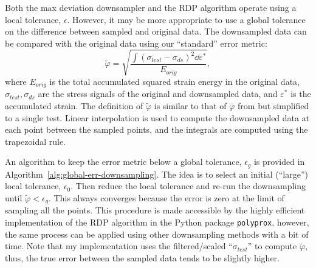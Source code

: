 \documentclass[a4paper,11pt]{article}
\begin{document}
Both the max deviation downsampler and the RDP algorithm operate using a local tolerance, $\epsilon$.
However, it may be more appropriate to use a global tolerance on the difference between sampled and original data.
The downsampled data can be compared with the original data using our ``standard'' error metric:
\begin{equation}
    \tilde{\varphi} = \sqrt{\frac{\int (\sigma_{test} - \sigma_{ds})^2 \dd \varepsilon^*}{E_{orig}}},
\end{equation}
where $E_{orig}$ is the total accumulated squared strain energy in the original data, $\sigma_{test}, \sigma_{ds}$ are the stress signals of the original and downsampled data, and $\varepsilon^*$ is the accumulated strain.
The definition of $\tilde{\varphi}$ is similar to that of $\bar{\varphi}$ from \citet{deCastroeSousaConsistencySolvingInverse2020} but simplified to a single test.
Linear interpolation is used to compute the downsampled data at each point between the sampled points, and the integrals are computed using the trapezoidal rule.

An algorithm to keep the error metric below a global tolerance, $\epsilon_g$ is provided in Algorithm~\ref{alg:global-err-downsampling}.
The idea is to select an initial (``large'') local tolerance, $\epsilon_0$.
Then reduce the local tolerance and re-run the downsampling until $\tilde{\varphi} < \epsilon_{g}$.
This always converges because the error is zero at the limit of sampling all the points.
This procedure is made accessible by the highly efficient implementation of the RDP algorithm in the Python package \texttt{polyprox}, however, the same process can be applied using other downsampling methods with a bit of time.
Note that my implementation uses the filtered/scaled ``$\sigma_{test}$'' to compute $\tilde{\varphi}$, thus, the true error between the sampled data tends to be slightly higher.
\end{document}
